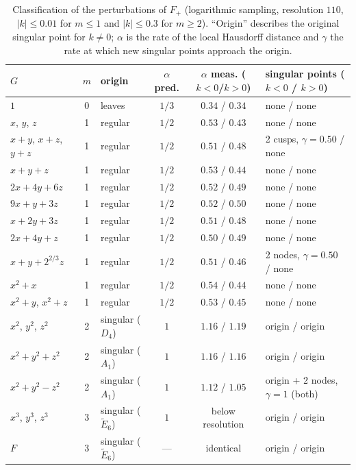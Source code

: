 \documentclass[12pt, a4paper, oneside]{book}
\theoremstyle{plain}
\theoremstyle{definition}
\theoremstyle{remark}
\begin{document}
\begin{table}[!h]
\centering
\footnotesize
\setlength{\tabcolsep}{4pt}
\begin{tabular}{l c l c c l}
\toprule
$G$ & $m$ & origin & $\alpha$ pred. & $\alpha$ meas. ($k<0$/$k>0$) & singular points ($k<0$ / $k>0$) \\
\midrule
$1$                        & 0 & leaves  & $1/3$ & $0.34$ / $0.34$ & none / none \\
$x$, $y$, $z$              & 1 & regular & $1/2$ & $0.53$ / $0.43$ & none / none \\
$x+y$, $x+z$, $y+z$        & 1 & regular & $1/2$ & $0.51$ / $0.48$ & 2 cusps, $\gamma=0.50$ / none \\
$x+y+z$                    & 1 & regular & $1/2$ & $0.53$ / $0.44$ & none / none \\
$2x+4y+6z$                 & 1 & regular & $1/2$ & $0.52$ / $0.49$ & none / none \\
$9x+y+3z$                  & 1 & regular & $1/2$ & $0.52$ / $0.50$ & none / none \\
$x+2y+3z$                  & 1 & regular & $1/2$ & $0.51$ / $0.48$ & none / none \\
$2x+4y+z$                  & 1 & regular & $1/2$ & $0.50$ / $0.49$ & none / none \\
$x+y+2^{2/3}z$             & 1 & regular & $1/2$ & $0.51$ / $0.46$ & 2 nodes, $\gamma=0.50$ / none \\
$x^2+x$                    & 1 & regular & $1/2$ & $0.54$ / $0.44$ & none / none \\
$x^2+y$, $x^2+z$           & 1 & regular & $1/2$ & $0.53$ / $0.45$ & none / none \\
$x^2$, $y^2$, $z^2$        & 2 & singular ($D_4$) & $1$ & $1.16$ / $1.19$ & origin / origin \\
$x^2+y^2+z^2$              & 2 & singular ($A_1$) & $1$ & $1.16$ / $1.16$ & origin / origin \\
$x^2+y^2-z^2$              & 2 & singular ($A_1$) & $1$ & $1.12$ / $1.05$ & origin + 2 nodes, $\gamma=1$ (both) \\
$x^3$, $y^3$, $z^3$        & 3 & singular ($\tilde E_6$) & $1$ & below resolution & origin / origin \\
$F$                        & 3 & singular ($\tilde E_6$) & --- & identical & origin / origin \\
\bottomrule
\end{tabular}
\caption[Classification of all experiments]{Classification of the
perturbations of $F_+$ (logarithmic sampling, resolution $110$, $|k|\le0.01$ for
$m\le1$ and $|k|\le0.3$ for $m\ge2$). ``Origin'' describes the original
singular point for $k\neq0$; $\alpha$ is the rate of the local Hausdorff
distance and $\gamma$ the rate at which new singular points approach the
origin.}
\label{tab:classification}
\end{table}
\end{document}
